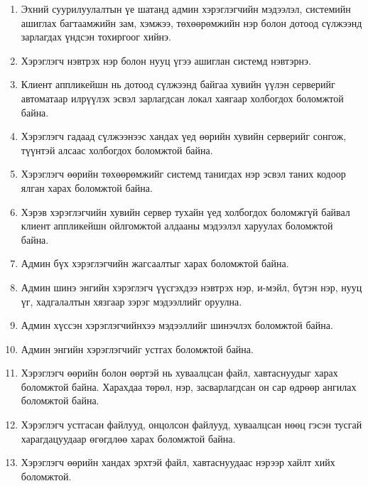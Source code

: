 \begin{enumerate}

\item Эхний суурилуулалтын үе шатанд админ хэрэглэгчийн мэдээлэл, системийн ашиглах багтаамжийн зам, хэмжээ, төхөөрөмжийн нэр болон дотоод сүлжээнд зарлагдах үндсэн тохиргоог хийнэ.

\item Хэрэглэгч нэвтрэх нэр болон нууц үгээ ашиглан системд нэвтэрнэ.

\item Клиент аппликейшн нь дотоод сүлжээнд байгаа хувийн үүлэн серверийг автоматаар илрүүлэх эсвэл зарлагдсан локал хаягаар холбогдох боломжтой байна.

\item Хэрэглэгч гадаад сүлжээнээс хандах үед өөрийн хувийн серверийг сонгож, түүнтэй алсаас холбогдох боломжтой байна.

\item Хэрэглэгч өөрийн төхөөрөмжийг системд танигдах нэр эсвэл таних кодоор ялган харах боломжтой байна.

\item Хэрэв хэрэглэгчийн хувийн сервер тухайн үед холбогдох боломжгүй байвал клиент аппликейшн ойлгомжтой алдааны мэдээлэл харуулах боломжтой байна.

\item Админ бүх хэрэглэгчийн жагсаалтыг харах боломжтой байна.

\item Админ шинэ энгийн хэрэглэгч үүсгэхдээ нэвтрэх нэр, и-мэйл, бүтэн нэр, нууц үг, хадгалалтын хязгаар зэрэг мэдээллийг оруулна.

\item Админ хүссэн хэрэглэгчийнхээ мэдээллийг шинэчлэх боломжтой байна.

\item Админ энгийн хэрэглэгчийг устгах боломжтой байна.

\item Хэрэглэгч өөрийн болон өөртэй нь хуваалцсан файл, хавтаснуудыг харах боломжтой байна. Харахдаа төрөл, нэр, засварлагдсан он сар өдрөөр ангилах боломжтой байна.

\item Хэрэглэгч устгасан файлууд, онцолсон файлууд, хуваалцсан нөөц гэсэн тусгай харагдацуудаар өгөгдлөө харах боломжтой байна.

\item Хэрэглэгч өөрийн хандах эрхтэй файл, хавтаснуудаас нэрээр хайлт хийх боломжтой.


\end{enumerate}
